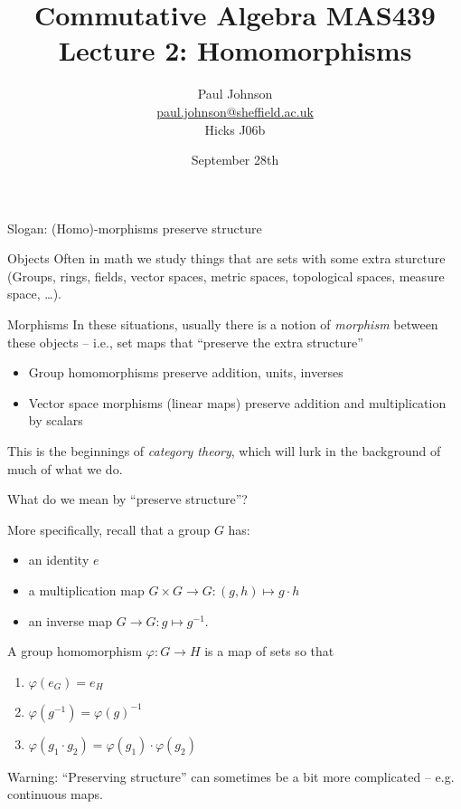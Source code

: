 \documentclass{beamer}
\title{Commutative Algebra MAS439 \\ Lecture 2: Homomorphisms}
\author{Paul Johnson \\ \href{mailto:paul.johnson@sheffield.ac.uk}{paul.johnson@sheffield.ac.uk} \\ Hicks J06b}
\date{September 28th}
\begin{document}
\begin{frame}
\titlepage
\end{frame}

\begin{frame}{Slogan: (Homo)-morphisms preserve structure}
\begin{block}{Objects}  Often in math we study things that are sets with some extra sturcture (Groups, rings, fields, vector spaces, metric spaces, topological spaces, measure space, \dots).
\end{block}
\begin{block}{Morphisms}  In these situations, usually there is a notion of \emph{morphism} between these objects -- i.e., set maps that ``preserve the extra structure''
\end{block}
  \begin{itemize}
  \item Group homomorphisms preserve addition, units, inverses
    \item Vector space morphisms (linear maps) preserve addition and multiplication by scalars
\end{itemize}
This is the beginnings of \emph{category theory}, which will lurk in the background of much of what we do.
\end{frame}

\begin{frame}{What do we mean by ``preserve structure''?}

  More specifically, recall that a group $G$ has:
  \begin{itemize}
  \item an identity $e$
  \item a multiplication map $G\times G\to G: (g,h)\mapsto g\cdot h$
    \item an inverse map $G\to G:g\mapsto g^{-1}$.
  \end{itemize}
  
  \begin{definition}
    A group homomorphism $\varphi:G\to H$ is a map of sets so that
    \begin{enumerate}
    \item $\varphi(e_G)=e_H$
    \item $\varphi(g^{-1})=\varphi(g)^{-1}$
      \item $\varphi(g_1\cdot g_2)=\varphi(g_1)\cdot \varphi(g_2)$
      \end{enumerate}
\end{definition}

\alert{Warning:} ``Preserving structure'' can sometimes be a bit more complicated -- e.g. continuous maps.  
\end{frame}
\end{document}
